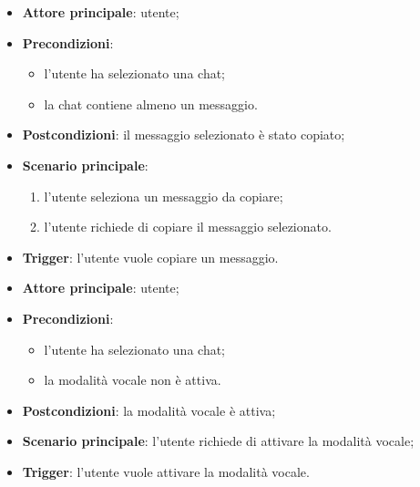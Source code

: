 \documentclass[10pt, a4paper]{article}
\begin{document}
    \begin{itemize}
        \item \textbf{Attore principale}: utente;
        \item \textbf{Precondizioni}: 
        \begin{itemize}
            \item l’utente ha selezionato una chat; 
            \item la chat contiene almeno un messaggio.
        \end{itemize}
        \item \textbf{Postcondizioni}: il messaggio selezionato è stato copiato;
        \item \textbf{Scenario principale}:
        \begin{enumerate}
            \item l’utente seleziona un messaggio da copiare;
            \item l’utente richiede di copiare il messaggio selezionato.
        \end{enumerate}
        \item \textbf{Trigger}: l’utente vuole copiare un messaggio.
    \end{itemize}

    \begin{itemize}
        \item \textbf{Attore principale}: utente;
        \item \textbf{Precondizioni}: 
            \begin{itemize}
                \item l’utente ha selezionato una chat;
                \item la modalità vocale non è attiva.
            \end{itemize}
        \item \textbf{Postcondizioni}: la modalità vocale è attiva;
        \item \textbf{Scenario principale}: l’utente richiede di attivare la modalità vocale;
        \item \textbf{Trigger}: l’utente vuole attivare la modalità vocale.
    \end{itemize}
    
\end{document}
